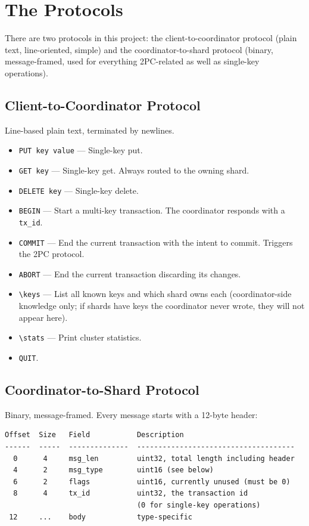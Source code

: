 \documentclass[11pt,a4paper]{article}
\begin{document}
\section{The Protocols}

There are two protocols in this project: the client-to-coordinator protocol (plain text, line-oriented, simple) and the coordinator-to-shard protocol (binary, message-framed, used for everything 2PC-related as well as single-key operations).

\subsection{Client-to-Coordinator Protocol}
Line-based plain text, terminated by newlines.

\begin{itemize}
\item \texttt{PUT key value} --- Single-key put.
\item \texttt{GET key} --- Single-key get. Always routed to the owning shard.
\item \texttt{DELETE key} --- Single-key delete.
\item \texttt{BEGIN} --- Start a multi-key transaction. The coordinator responds with a \texttt{tx\_id}.
\item \texttt{COMMIT} --- End the current transaction with the intent to commit. Triggers the 2PC protocol.
\item \texttt{ABORT} --- End the current transaction discarding its changes.
\item \verb|\keys| --- List all known keys and which shard owns each (coordinator-side knowledge only; if shards have keys the coordinator never wrote, they will not appear here).
\item \verb|\stats| --- Print cluster statistics.
\item \texttt{QUIT}.
\end{itemize}

\subsection{Coordinator-to-Shard Protocol}
Binary, message-framed. Every message starts with a 12-byte header:

\begin{codebox}
\begin{lstlisting}
Offset  Size   Field           Description
------  -----  --------------  -------------------------------------
  0      4     msg_len         uint32, total length including header
  4      2     msg_type        uint16 (see below)
  6      2     flags           uint16, currently unused (must be 0)
  8      4     tx_id           uint32, the transaction id
                               (0 for single-key operations)
 12     ...    body            type-specific
\end{lstlisting}
\end{codebox}
\end{document}

